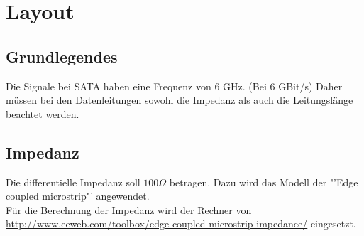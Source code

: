 
\section{Layout}

\subsection{Grundlegendes}
Die Signale bei SATA haben eine Frequenz von 6 GHz. (Bei 6 GBit/s)
Daher müssen bei den Datenleitungen sowohl die Impedanz als auch die 
Leitungslänge beachtet werden. 

\subsection{Impedanz}
Die differentielle Impedanz soll $100 \Omega$ betragen. Dazu wird das Modell 
der "'Edge coupled microstrip"' angewendet. 
\[  \]
Für die Berechnung der Impedanz wird der Rechner von 
\url{http://www.eeweb.com/toolbox/edge-coupled-microstrip-impedance/} 
eingesetzt. 

